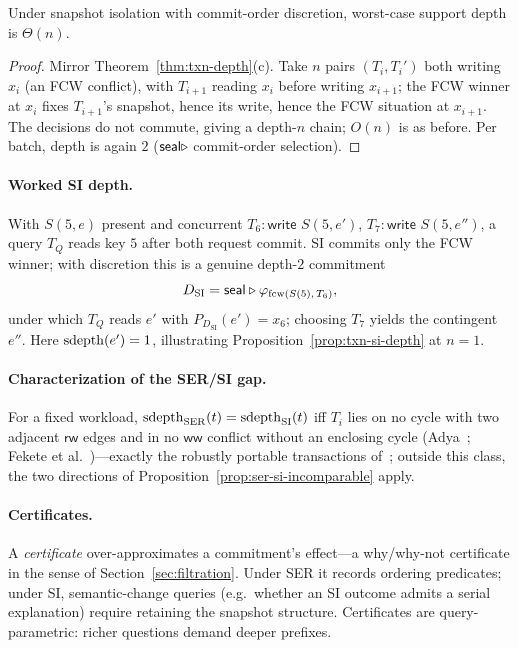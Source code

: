 \begin{proposition}
  \label{prop:txn-si-depth}
  Under snapshot isolation with commit-order discretion, worst-case support
  depth is $\Theta(n)$.
\end{proposition}
\begin{proof}
  Mirror Theorem~\ref{thm:txn-depth}(c). Take $n$ pairs $(T_i,T_i')$ both
  writing $x_i$ (an FCW conflict), with $T_{i+1}$ reading $x_i$ before writing
  $x_{i+1}$; the FCW winner at $x_i$ fixes $T_{i+1}$'s snapshot, hence its write,
  hence the FCW situation at $x_{i+1}$. The decisions do not commute, giving a
  depth-$n$ chain; $O(n)$ is as before. Per batch, depth is again $2$
  ($\mathsf{seal} \mathbin{\triangleright}$ commit-order selection).
\end{proof}

\paragraph{Worked SI depth.}
With $S(5,e)$ present and concurrent $T_6\!:\textsf{write } S(5,e')$,
$T_7\!:\textsf{write } S(5,e'')$, a query $T_Q$ reads key $5$ after both request
commit. SI commits only the FCW winner; with discretion this is a genuine
depth-$2$ commitment
\[
  D_{\mathrm{SI}} = \mathsf{seal} \mathbin{\triangleright} \varphi_{\mathrm{fcw}(S(5),\,T_6)},
\]
under which $T_Q$ reads $e'$ with $P_{D_{\mathrm{SI}}}(e') = x_6$; choosing $T_7$
yields the contingent $e''$. Here $\operatorname{sdepth}(e') = 1$, illustrating
Proposition~\ref{prop:txn-si-depth} at $n=1$.

\paragraph{Characterization of the SER/SI gap.}
For a fixed workload, $\operatorname{sdepth}_{\mathrm{SER}}(t) = \operatorname{sdepth}_{\mathrm{SI}}(t)$ iff
$T_i$ lies on no cycle with two adjacent $\mathsf{rw}$ edges and in no
$\mathsf{ww}$ conflict without an enclosing cycle (Adya~\cite{adya1999weak};
Fekete et al.~\cite{fekete2005making})---exactly the robustly portable
transactions of~\cite{vandevoort2025mixed}; outside this class, the two
directions of Proposition~\ref{prop:ser-si-incomparable} apply.

\paragraph{Certificates.}
A \emph{certificate} over-approximates a commitment's effect---a why/why-not
certificate in the sense of Section~\ref{sec:filtration}. Under SER it records
ordering predicates; under SI, semantic-change queries (e.g.\ whether an SI
outcome admits a serial explanation) require retaining the snapshot structure.
Certificates are query-parametric: richer questions demand deeper prefixes.

